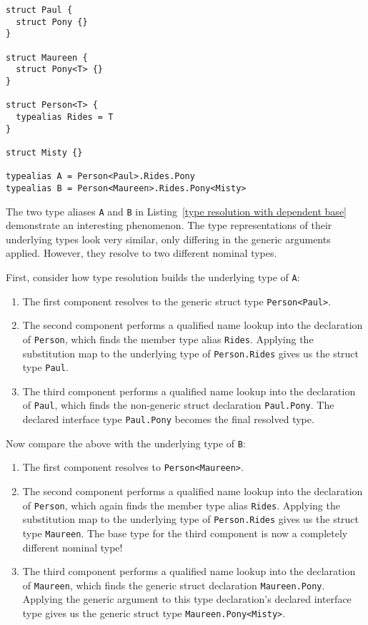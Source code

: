 \documentclass[../generics]{subfiles}
\begin{document}
\begin{listing}\label{type resolution with dependent base}
\begin{Verbatim}
struct Paul {
  struct Pony {}
}

struct Maureen {
  struct Pony<T> {}
}

struct Person<T> {
  typealias Rides = T
}

struct Misty {}

typealias A = Person<Paul>.Rides.Pony
typealias B = Person<Maureen>.Rides.Pony<Misty>
\end{Verbatim}
\end{listing}
\begin{example}
The two type aliases \texttt{A} and \texttt{B} in Listing~\ref{type resolution with dependent base} demonstrate an interesting phenomenon. The type representations of their underlying types look very similar, only differing in the generic arguments applied. However, they resolve to two different nominal types.

First, consider how type resolution builds the underlying type of \texttt{A}:
\begin{enumerate}
\item The first component resolves to the generic struct type \texttt{Person<Paul>}.
\item The second component performs a qualified name lookup into the declaration of \texttt{Person}, which finds the member type alias \texttt{Rides}. Applying the substitution map to the underlying type of \texttt{Person.Rides} gives us the struct type \texttt{Paul}.
\item The third component performs a qualified name lookup into the declaration of \texttt{Paul}, which finds the non-generic struct declaration \texttt{Paul.Pony}. The declared interface type \texttt{Paul.Pony} becomes the final resolved type.
\end{enumerate}
Now compare the above with the underlying type of \texttt{B}:
\begin{enumerate}
\item The first component resolves to \texttt{Person<Maureen>}.
\item The second component performs a qualified name lookup into the declaration of \texttt{Person}, which again finds the member type alias \texttt{Rides}. Applying the substitution map to the underlying type of \texttt{Person.Rides} gives us the struct type \texttt{Maureen}. The base type for the third component is now a completely different nominal type!
\item The third component performs a qualified name lookup into the declaration of \texttt{Maureen}, which finds the generic struct declaration \texttt{Maureen.Pony}. Applying the generic argument to this type declaration's declared interface type gives us the generic struct type \texttt{Maureen.Pony<Misty>}.
\end{enumerate}


\end{example}
\end{document}
